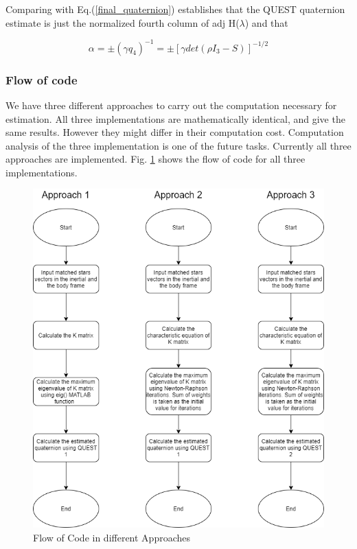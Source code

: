 \documentclass[../../main.tex]{subfiles}
\begin{document}
{{{Comparing with Eq.(\ref{final_quaternion}) establishes that the QUEST quaternion estimate is just the normalized fourth column of adj H($\lambda$) and that

\begin{equation}
   \alpha = \pm (\gamma \hat{q}_{4})^{-1} = \pm [\gamma det(\rho I_{3} - S)]^{-1/2}
\end{equation}

}



\subsubsection{Flow of code}
{
We have three different approaches to carry out the computation necessary for estimation. All three implementations are mathematically identical, and give the same results. However they might differ in their computation cost. Computation analysis of the three implementation is one of the future tasks. Currently all three approaches are implemented. Fig. \ref{sec:esti_flow_of_code} shows the flow of code for all three implementations.
\begin{figure}
\centering
\includegraphics[scale=0.50]{Figures/GNC/estimation_flowchart.png}
\caption{Flow of Code in different Approaches}
\label{sec:esti_flow_of_code}
\end{figure}

}}}
\end{document}

